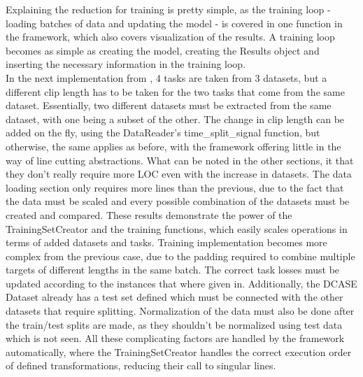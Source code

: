 Explaining the reduction for training is pretty simple, as the training loop - loading batches of data and updating the model - is covered in one function in the framework, which also covers visualization of the results. A training loop becomes as simple as creating the model, creating the Results object and inserting the necessary information in the training loop. \\

\textbf{\citet{georgiev2017low}} In the next implementation from \citet{georgiev2017low}, 4 tasks are taken from 3 datasets, but a different clip length has to be taken for the two tasks that come from the same dataset. Essentially, two different datasets must be extracted from the same dataset, with one being a subset of the other. The change in clip length can be added on the fly, using the DataReader's time\_split\_signal function, but otherwise, the same applies as before, with the framework offering little in the way of line cutting abstractions. What can be noted in the other sections, it that they don't really require more LOC even with the increase in datasets. The data loading section only requires more lines than the previous, due to the fact that the data must be scaled and every possible combination of the datasets must be created and compared. These results demonstrate the power of the TrainingSetCreator and the training functions, which easily scales operations in terms of added datasets and tasks. Training implementation becomes more complex from the previous case, due to the padding required to combine multiple targets of different lengths in the same batch. The correct task losses must be updated according to the instances that where given in. Additionally, the DCASE Dataset already has a test set defined which must be connected with the other datasets that require splitting. Normalization of the data must also be done after the train/test splits are made, as they shouldn't be normalized using test data which is not seen. All these complicating factors are handled by the framework automatically, where the TrainingSetCreator handles the correct execution order of defined transformations, reducing their call to singular lines. \\

